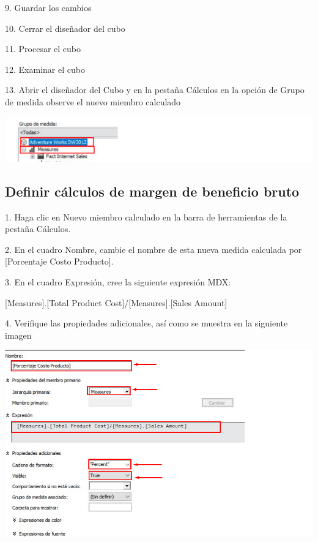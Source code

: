 9. Guardar los cambios

10. Cerrar el diseñador del cubo

11. Procesar el cubo

12. Examinar el cubo

13. Abrir el diseñador del Cubo y en la pestaña Cálculos en la opción de Grupo de medida observe el nuevo miembro
calculado

	\begin{center}
	\includegraphics[width=\columnwidth]{images/task7/img8}
	\end{center}	

\subsection{Definir cálculos de margen de beneficio bruto}  

1. Haga clic en Nuevo miembro calculado en la barra de herramientas de la pestaña Cálculos. 

2. En el cuadro Nombre, cambie el nombre de esta nueva medida calculada por [Porcentaje Costo Producto].

3. En el cuadro Expresión, cree la siguiente expresión MDX:

[Measures].[Total Product Cost]/[Measures].[Sales Amount]

4. Verifique las propiedades adicionales, así como se muestra en la siguiente imagen

	\begin{center}
	\includegraphics[width=\columnwidth]{images/task7/img9}
	\end{center}	



